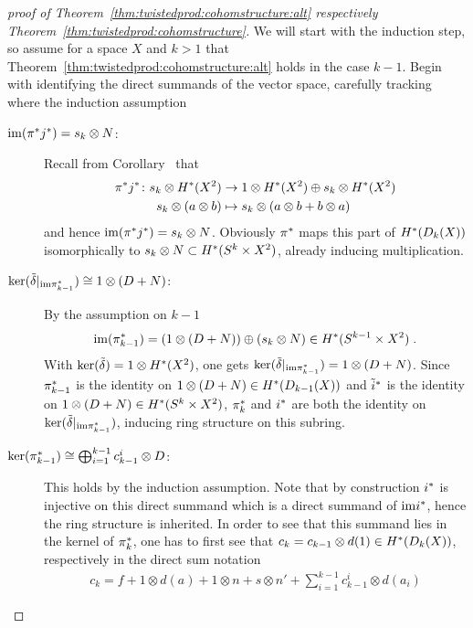 \begin{proof}[proof of
  Theorem~\ref{thm:twistedprod:cohomstructure:alt}
  respectively Theorem~\ref{thm:twistedprod:cohomstructure}]
  We will start with the induction step, so assume for a space $X$ and
  $k>1$ that Theorem~\ref{thm:twistedprod:cohomstructure:alt} holds in
  the case $k-1$.
  Begin with identifying the direct summands of the vector space,
  carefully tracking where the induction assumption
  \begin{description}
  \item[$\mathrm{im}({\pi}^*{j}^*)=s_k\otimes N$:]
    Recall from
    Corollary~
    that
    \begin{align*}
      {\pi}^*{j}^*\colon
      s_k\otimes H^*(X^2)
      &\to 1\otimes H^*(X^2)\oplus s_k\otimes H^*(X^2)\\
      s_k\otimes(a\otimes b)
      &\mapsto s_k\otimes(a\otimes b+b\otimes a)
    \end{align*}
    and hence $\mathrm{im}({\pi}^*{j}^*)=s_k\otimes N$.
    Obviously ${\pi}^*$ maps this part of $H^*(D_{k}({X}))$
    isomorphically to $s_k\otimes N\subset H^*(S^{k}\times X^2)$,
    already inducing multiplication.
  \item[$\ker(\tilde\delta|_{\mathrm{im}{\pi}^*_{k-1}})\cong 1\otimes (D+N)$:]
    By the assumption on $k-1$
    \begin{gather*}
      \mathrm{im}({\pi}^*_{k-1})
      =(1\otimes(D+N))\oplus (s_k\otimes N)
      \in H^*(S^{k-1}\times X^2)
      \;.
    \end{gather*}
    With $\ker(\tilde\delta) = 1\otimes H^*(X^2)$, one gets
    $\ker(\tilde\delta|_{\mathrm{im}{\pi}^*_{k-1}}) = 1\otimes (D+N)$.
    Since ${\pi}^*_{k-1}$ is the identity on
    $1\otimes(D+N)\in H^*(D_{k-1}({X}))$ and ${\tilde i}^*$ is
    the identity on $1\otimes(D+N)\in H^*(S^{k}\times X^2)$,
    ${\pi}^*_{k}$ and ${i}^*$ are both the identity on
    $\ker(\tilde\delta|_{\mathrm{im}{\pi}^*_{k-1}})$, inducing ring structure
    on this subring.
  \item[$\ker({\pi}^*_{k-1})\cong \bigoplus_{i=1}^{k-1} c_{k-1}^i\otimes D$:]
    This holds by the induction assumption.
    Note that by construction ${i}^*$ is injective on this direct
    summand which is a direct summand of $\mathrm{im}{i}^*$,
    hence the ring structure is inherited.
    In order to see that this summand lies in the kernel of
    ${\pi}^*_k$, one has to first see that
    $c_k=c_{k-1}\otimes d(1)\in H^*(D_{k}({X}))$, respectively
    in the direct sum notation
    \begin{gather*}
      c_k = f + 1\otimes d(a) + 1\otimes n + s\otimes n'
      + \sum_{i=1}^{k-1} c_{k-1}^i\otimes d(a_i)

\end{gather*}
\end{description}
\end{proof}
